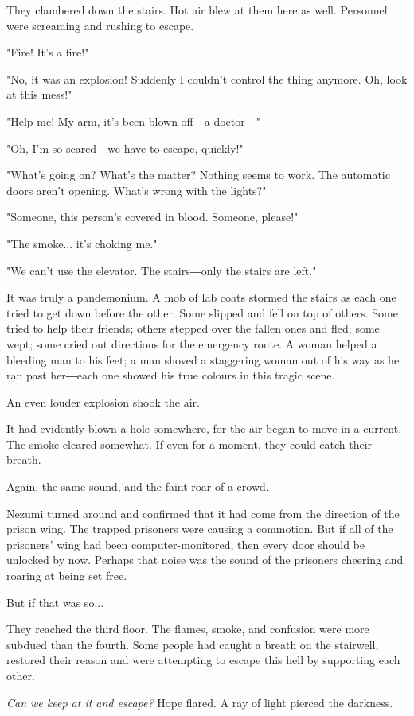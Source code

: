 They clambered down the stairs. Hot air blew at them here as well.
Personnel were screaming and rushing to escape.

"Fire! It's a fire!"

"No, it was an explosion! Suddenly I couldn't control the thing anymore.
Oh, look at this mess!"

"Help me! My arm, it's been blown off―a doctor―"

"Oh, I'm so scared―we have to escape, quickly!"

"What's going on? What's the matter? Nothing seems to work. The
automatic doors aren't opening. What's wrong with the lights?"

"Someone, this person's covered in blood. Someone, please!"

"The smoke... it's choking me."

"We can't use the elevator. The stairs―only the stairs are left."

It was truly a pandemonium. A mob of lab coats stormed the stairs as
each one tried to get down before the other. Some slipped and fell on
top of others. Some tried to help their friends; others stepped over the
fallen ones and fled; some wept; some cried out directions for the
emergency route. A woman helped a bleeding man to his feet; a man shoved
a staggering woman out of his way as he ran past her―each one showed his
true colours in this tragic scene.

An even louder explosion shook the air.

It had evidently blown a hole somewhere, for the air began to move in a
current. The smoke cleared somewhat. If even for a moment, they could
catch their breath.

Again, the same sound, and the faint roar of a crowd.

Nezumi turned around and confirmed that it had come from the direction
of the prison wing. The trapped prisoners were causing a commotion. But
if all of the prisoners' wing had been computer-monitored, then every
door should be unlocked by now. Perhaps that noise was the sound of the
prisoners cheering and roaring at being set free.

But if that was so...

They reached the third floor. The flames, smoke, and confusion were more
subdued than the fourth. Some people had caught a breath on the
stairwell, restored their reason and were attempting to escape this hell
by supporting each other.

\emph{Can we keep at it and escape?} Hope flared. A ray of light pierced the
darkness.

